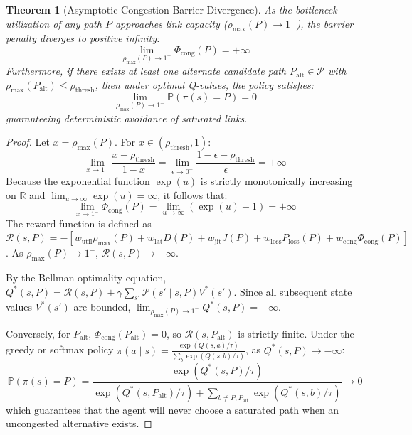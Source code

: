 \documentclass[12pt,a4paper,oneside]{report}
\newtheorem{theorem}{Theorem}[chapter]
\begin{document}
\begin{theorem}[Asymptotic Congestion Barrier Divergence]
As the bottleneck utilization of any path $P$ approaches link capacity ($\rho_{\max}(P) \to 1^-$), the barrier penalty diverges to positive infinity:
\begin{equation}
    \lim_{\rho_{\max}(P) \to 1^-} \Phi_{\text{cong}}(P) = +\infty
\end{equation}
Furthermore, if there exists at least one alternate candidate path $P_{\text{alt}} \in \mathcal{P}$ with $\rho_{\max}(P_{\text{alt}}) \le \rho_{\text{thresh}}$, then under optimal Q-values, the policy satisfies:
\begin{equation}
    \lim_{\rho_{\max}(P) \to 1^-} \mathbb{P}\left(\pi(s) = P\right) = 0
\end{equation}
guaranteeing deterministic avoidance of saturated links.
\end{theorem}

\begin{proof}
Let $x = \rho_{\max}(P)$. For $x \in (\rho_{\text{thresh}}, 1)$:
\begin{equation}
    \lim_{x \to 1^-} \frac{x - \rho_{\text{thresh}}}{1 - x} = \lim_{\epsilon \to 0^+} \frac{1 - \epsilon - \rho_{\text{thresh}}}{\epsilon} = +\infty
\end{equation}
Because the exponential function $\exp(u)$ is strictly monotonically increasing on $\mathbb{R}$ and $\lim_{u \to \infty} \exp(u) = \infty$, it follows that:
\begin{equation}
    \lim_{x \to 1^-} \Phi_{\text{cong}}(P) = \lim_{u \to \infty} (\exp(u) - 1) = +\infty
\end{equation}
The reward function is defined as $\mathcal{R}(s, P) = - [w_{\text{util}} \rho_{\max}(P) + w_{\text{lat}} D(P) + w_{\text{jit}} J(P) + w_{\text{loss}} P_{\text{loss}}(P) + w_{\text{cong}} \Phi_{\text{cong}}(P)]$. As $\rho_{\max}(P) \to 1^-$, $\mathcal{R}(s, P) \to -\infty$.

By the Bellman optimality equation, $Q^*(s, P) = \mathcal{R}(s, P) + \gamma \sum_{s'} \mathcal{P}(s' \mid s, P) V^*(s')$. Since all subsequent state values $V^*(s')$ are bounded, $\lim_{\rho_{\max}(P) \to 1^-} Q^*(s, P) = -\infty$.

Conversely, for $P_{\text{alt}}$, $\Phi_{\text{cong}}(P_{\text{alt}}) = 0$, so $\mathcal{R}(s, P_{\text{alt}})$ is strictly finite. Under the greedy or softmax policy $\pi(a \mid s) = \frac{\exp(Q(s, a)/\tau)}{\sum_{b} \exp(Q(s, b)/\tau)}$, as $Q^*(s, P) \to -\infty$:
\begin{equation}
    \mathbb{P}\left(\pi(s) = P\right) = \frac{\exp(Q^*(s, P)/\tau)}{\exp(Q^*(s, P_{\text{alt}})/\tau) + \sum_{b \ne P, P_{\text{alt}}} \exp(Q^*(s, b)/\tau)} \to 0
\end{equation}
which guarantees that the agent will never choose a saturated path when an uncongested alternative exists.
\end{proof}
\end{document}
